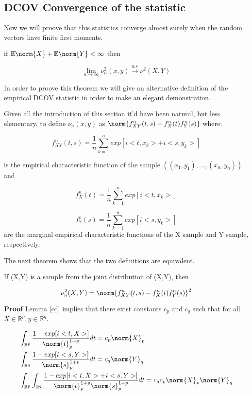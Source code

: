 \newpage
\subsection{DCOV Convergence of the statistic \label{P:DCOVCOV}}

Now we will proove that this statistics converge almost surely when the random vectors have finite first moments.

\begin{thm}\label{Objective}
if $\mathbb{E}\norm{X} + \mathbb{E}\norm{Y} < \infty$ then

$$
\lim_{n\to\infty} \nu^{2}_{n}(x,y) \xrightarrow{a.s} \nu^{2}(X,Y)
$$
\end{thm}

In order to proove this theorem we will give an alternative definition of the empirical DCOV statistic in order to make an elegant demonstration.

\begin{defn}
Given all the introduction of this section it'd have been natural, but less elementary, to define $\nu_{n}(x,y)$ as $\norm{f_{XY}^{n}(t,s) - f_{X}^{n}(t)f_{Y}^{n}(s)}$ where:

$$
f_{XY}^{n}(t,s) = \frac{1}{n}\sum_{k=1}^{n}exp[i<t,x_{k}> + i<s,y_{k}>] 
$$

is the empirical characteristic function of the sample $((x_{1},y_{1}),...,(x_{n},y_{n}))$ and 

$$
f_{X}^{n}(t) = \frac{1}{n}\sum_{k=1}^{n}exp[i<t,x_{k}>]
$$

$$
f_{Y}^{n}(s) = \frac{1}{n}\sum_{k=1}^{n}exp[i<s,y_{k}>]
$$
are the marginal empirical characteristic functions of the X sample and Y sample, respectively.
\end{defn}

The next theorem shows that the two definitions are equivalent.

\begin{thm}
If (X,Y) is a sample from the joint distribution of (X,Y), then

$$
\nu_{n}^{2}(X,Y) = \norm{f_{XY}^{n}(t,s) - f_{X}^{n}(t)f_{Y}^{n}(s)}^{2}
$$
\end{thm}

\textbf{Proof}
Lemma \ref{cd} implies that there exist constants $c_{p}$ and $c_{q}$ such that for all $X\in \mathbb{R}^{p}, y\in \mathbb{R}^{q}$.

\begin{equation}{}
\begin{split}
&\int_{\mathbb{R}^{p}}\frac{1- exp[i<t,X>]}{\norm{t}_{p}^{1+p}}dt = c_p\norm{X}_{p} \\
&\int_{\mathbb{R}^{q}}\frac{1- exp[i<s,Y>]}{\norm{s}_{p}^{1+p}}dt = c_q\norm{Y}_{q} \\
&\int_{\mathbb{R}^{p}}\int_{\mathbb{R}^{q}}\frac{1- exp[i<t,X>+i<s,Y>]}{\norm{t}_{p}^{1+p}\norm{s}_{p}^{1+p}}dt = c_{q}c_{p}\norm{X}_{p}\norm{Y}_{q}
\end{split}
\end{equation}

